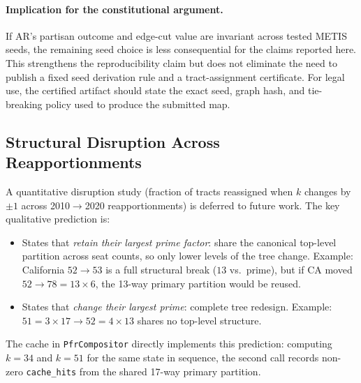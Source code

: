 \paragraph{Implication for the constitutional argument.}
If AR's partisan outcome and edge-cut value are invariant across tested METIS
seeds, the remaining seed choice is less consequential for the claims reported
here.
This strengthens the reproducibility claim but does not eliminate the need to
publish a fixed seed derivation rule and a tract-assignment certificate.
For legal use, the certified artifact should state the exact seed, graph hash,
and tie-breaking policy used to produce the submitted map.

\subsection{Structural Disruption Across Reapportionments}
\label{sec:eval:disruption}

A quantitative disruption study (fraction of tracts reassigned when $k$ changes
by $\pm 1$ across 2010$\to$2020 reapportionments) is deferred to future work.
The key qualitative prediction is:

\begin{itemize}
  \item States that \emph{retain their largest prime factor}: share the canonical
        top-level partition across seat counts, so only lower levels of the tree
        change. Example: California $52 \to 53$ is a full structural break ($13$
        vs.\ prime), but if CA moved $52 \to 78 = 13 \times 6$, the 13-way
        primary partition would be reused.
  \item States that \emph{change their largest prime}: complete tree redesign.
        Example: $51 = 3 \times 17 \to 52 = 4 \times 13$ shares no top-level
        structure.
\end{itemize}

The cache in \texttt{PfrCompositor} directly implements this prediction:
computing $k=34$ and $k=51$ for the same state in sequence, the second call
records non-zero \texttt{cache\_hits} from the shared 17-way primary partition.

